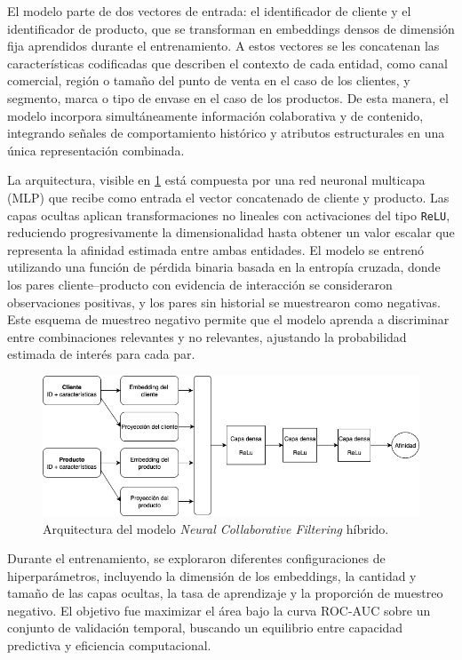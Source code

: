 El modelo parte de dos vectores de entrada: el identificador de cliente y el identificador de producto, que se transforman en embeddings densos de dimensión fija aprendidos durante el entrenamiento. A estos vectores se les concatenan las características codificadas que describen el contexto de cada entidad, como canal comercial, región o tamaño del punto de venta en el caso de los clientes, y segmento, marca o tipo de envase en el caso de los productos. De esta manera, el modelo incorpora simultáneamente información colaborativa y de contenido, integrando señales de comportamiento histórico y atributos estructurales en una única representación combinada.

La arquitectura, visible en \ref{fig:ncf_hibrido} está compuesta por una red neuronal multicapa (MLP) que recibe como entrada el vector concatenado de cliente y producto. Las capas ocultas aplican transformaciones no lineales con activaciones del tipo \texttt{ReLU}, reduciendo progresivamente la dimensionalidad hasta obtener un valor escalar que representa la afinidad estimada entre ambas entidades. El modelo se entrenó utilizando una función de pérdida binaria basada en la entropía cruzada, donde los pares cliente–producto con evidencia de interacción se consideraron observaciones positivas, y los pares sin historial se muestrearon como negativas. Este esquema de muestreo negativo permite que el modelo aprenda a discriminar entre combinaciones relevantes y no relevantes, ajustando la probabilidad estimada de interés para cada par.

\begin{figure}[htpb]
	\centering
	\includegraphics[scale=.5]{./Figures/ncf_hibrido.png}
	\caption{Arquitectura del modelo \textit{Neural Collaborative Filtering} híbrido.}
	\label{fig:ncf_hibrido}
\end{figure}

Durante el entrenamiento, se exploraron diferentes configuraciones de hiperparámetros, incluyendo la dimensión de los embeddings, la cantidad y tamaño de las capas ocultas, la tasa de aprendizaje y la proporción de muestreo negativo. El objetivo fue maximizar el área bajo la curva ROC-AUC sobre un conjunto de validación temporal, buscando un equilibrio entre capacidad predictiva y eficiencia computacional.

